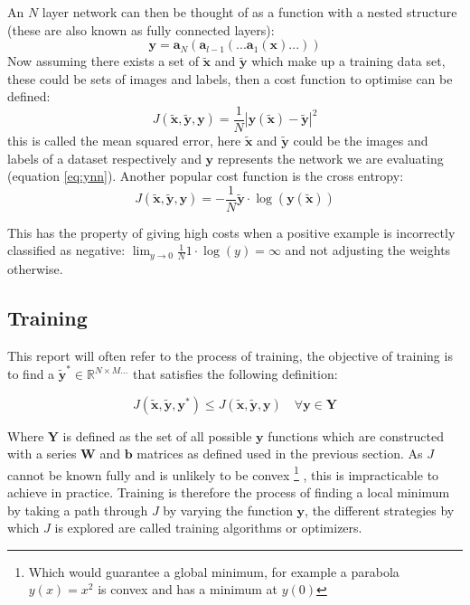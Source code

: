     An $N$ layer network can then be thought of as a function with a nested
    structure (these are also known as fully connected layers):
    \begin{equation} \label{eq:ynn}
      \mathbf{y} = \mathbf{a}_{N}(\mathbf{a}_{l-1}(...\mathbf{a}_1(\mathbf{x})...))
    \end{equation}
    Now assuming there exists a set of $\tilde{\mathbf{x}}$ and $\tilde{\mathbf{y}}$ which make
    up a training data set, these could be sets of images and labels, then a cost function
    to optimise can be defined:
    \begin{equation}
      J(\tilde{\mathbf{x}},\tilde{\mathbf{y}},\mathbf{y}) = \frac{1}{N}\left |\mathbf{y}(\tilde{\mathbf{x}})-\tilde{\mathbf{y}}\right | ^2
    \end{equation}
    this is called the mean squared error, here $\tilde{\mathbf{x}}$ and $\tilde{\mathbf{y}}$ could
    be the images and labels of a dataset respectively and $\mathbf{y}$ represents the network we are evaluating (equation \ref{eq:ynn}). Another popular cost function is
    the cross entropy:
    \begin{equation}
      J(\tilde{\mathbf{x}},\tilde{\mathbf{y}},\mathbf{y}) = -\frac{1}{N}\tilde{\mathbf{y}}\cdot\log(\mathbf{y}(\tilde{\mathbf{x}}))
    \end{equation}

    This has the property of giving high costs when a positive example is incorrectly classified as negative: $\lim _{y\rightarrow0}\frac{1}{N}1\cdot \log(y) = \infty$
    and not adjusting the weights otherwise.

  \subsection{Training}
      This report will often refer to the process of training, the objective of training is to find
      a $\tilde{\mathbf{y}}^* \in \mathbb{R}^{N\times M...}$ that satisfies the following definition:

      \begin{equation}
        J(\tilde{\mathbf{x}},\tilde{\mathbf{y}},\mathbf{y}^*) \leq J(\tilde{\mathbf{x}},\tilde{\mathbf{y}},\mathbf{y}) \quad \forall \mathbf{y} \in \mathbf{Y}
      \end{equation}

      Where $\mathbf{Y}$ is defined as the set of all possible $\mathbf{y}$ functions which are constructed with a series $\mathbf{W}$ and $\mathbf{b}$ matrices as defined used in the previous section.
      As $J$ cannot be known fully and is unlikely to be convex \footnote{Which would guarantee a global minimum, for example a parabola $y(x)=x^2$ is convex and has a minimum at $y(0)$}
      , this is impracticable to achieve in practice.
      Training is therefore the process of finding a local minimum by taking a path through $J$ by varying
      the function $ \mathbf{y} $, the different strategies by which $J$ is explored are called
      training algorithms or optimizers.

